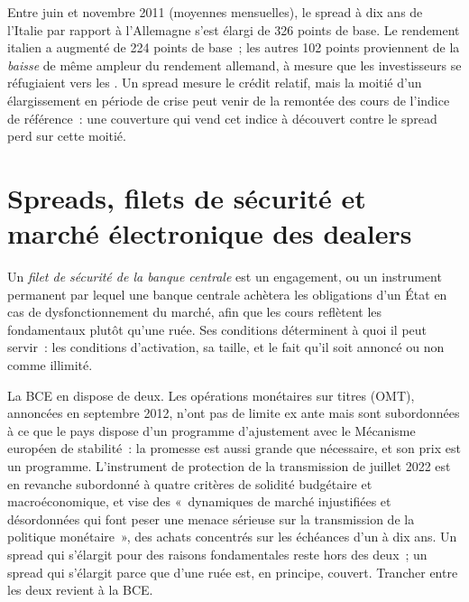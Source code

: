 \begin{example}\label{ex:m2:european-and-japanese-government-bonds:2011}
Entre juin et novembre 2011 (moyennes mensuelles), le spread à dix ans de l'Italie
par rapport à l'Allemagne s'est élargi de 326 points de base. Le rendement italien a augmenté de 224 points de base~; les
autres 102 points proviennent de la \emph{baisse} de même ampleur du rendement allemand, à mesure que les investisseurs se
réfugiaient vers les . Un spread mesure le crédit relatif, mais la moitié d'un élargissement
en période de crise peut venir de la remontée des cours de l'indice de référence~: une couverture qui vend cet indice à découvert contre le
spread perd sur cette moitié.
\end{example}

\section{Spreads, filets de sécurité et marché électronique des dealers}

\begin{definition}\label{def:m2:european-and-japanese-government-bonds:backstop}
Un \emph{filet de sécurité de la banque centrale} est un engagement, ou
un instrument permanent par lequel une banque centrale achètera les obligations d'un État
en cas de dysfonctionnement du marché, afin que les cours reflètent les fondamentaux plutôt qu'une
ruée. Ses conditions déterminent à quoi il peut servir~: les conditions d'activation,
sa taille, et le fait qu'il soit annoncé ou non comme illimité.
\end{definition}

La BCE en dispose de deux. Les opérations monétaires sur titres (OMT), annoncées en septembre 2012,
n'ont pas de limite ex ante mais sont subordonnées à ce que le pays dispose d'un programme d'ajustement
avec le Mécanisme européen de stabilité~: la promesse est aussi grande que
nécessaire, et son prix est un programme. L'instrument de protection de la transmission
de juillet 2022 est en revanche subordonné à quatre critères de solidité budgétaire
et macroéconomique, et vise des «~dynamiques de marché injustifiées et désordonnées
qui font peser une menace sérieuse sur la transmission de la politique monétaire~»,
des achats concentrés sur les échéances d'un à dix ans. Un spread qui
s'élargit pour des raisons fondamentales reste hors des deux~; un spread qui s'élargit parce que
d'une ruée est, en principe, couvert. Trancher entre les deux revient à la BCE.

